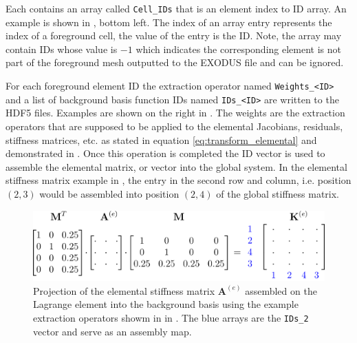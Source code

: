 Each contains an array called \texttt{Cell\_IDs} that is an element index to ID array. An example is shown in , bottom left. The index of an array entry represents the index of a foreground cell, the value of the entry is the ID. Note, the array may contain IDs whose value is $-1$ which indicates the corresponding element is not part of the foreground mesh outputted to the EXODUS file and can be ignored.

For each foreground element ID the extraction operator named \texttt{Weights\_<ID>} and a list of background basis function IDs named \texttt{IDs\_<ID>} are written to the HDF5 files. Examples are shown on the right in . The weights are the extraction operators that are supposed to be applied to the elemental Jacobians, residuals, stiffness matrices, etc. as stated in equation \eqref{eq:transform_elemental} and demonstrated in . Once this operation is completed the ID vector is used to assemble the elemental matrix, or vector into the global system. In the elemental stiffness matrix example in , the entry in the second row and column, i.e. position $(2,3)$ would be assembled into position $(2,4)$ of the global stiffness matrix.

\begin{figure}[h]
    \begin{center}
    \includegraphics[width=12cm]{Figures/assembly.png}
    \caption{Projection of the elemental stiffness matrix $\bm{A}^{(e)}$ assembled on the Lagrange element into the background basis using the example extraction operators showm in in . The blue arrays are the \texttt{IDs\_2} vector and serve as an assembly map.} 
    \label{fig:assembly}
    \end{center}
\end{figure}



